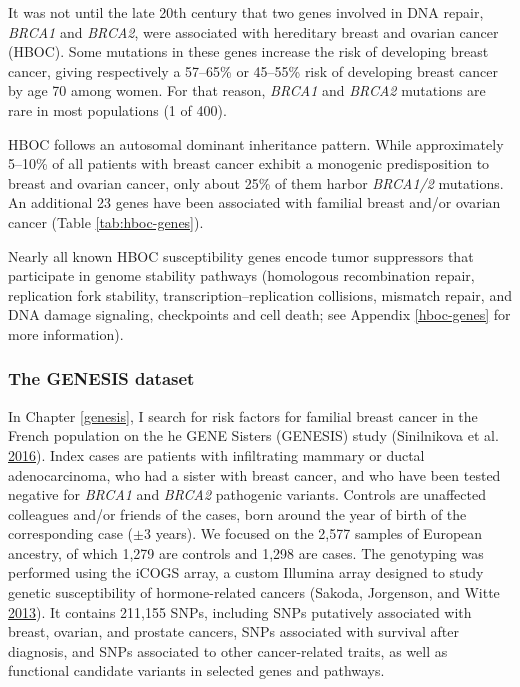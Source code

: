 \documentclass[
  11pt,
]{env/yjiao}
\begin{document}
It was not until the late 20th century that two genes involved in DNA repair, \emph{BRCA1} and \emph{BRCA2}, were associated with hereditary breast and ovarian cancer (HBOC). Some mutations in these genes increase the risk of developing breast cancer, giving respectively a 57--65\% or 45--55\% risk of developing breast cancer by age 70 among women. For that reason, \emph{BRCA1} and \emph{BRCA2} mutations are rare in most populations (1 of 400).

HBOC follows an autosomal dominant inheritance pattern. While approximately 5--10\% of all patients with breast cancer exhibit a monogenic predisposition to breast and ovarian cancer, only about 25\% of them harbor \emph{BRCA1/2} mutations. An additional 23 genes have been associated with familial breast and/or ovarian cancer (Table \ref{tab:hboc-genes}).

Nearly all known HBOC susceptibility genes encode tumor suppressors that participate in genome stability pathways (homologous recombination repair, replication fork stability, transcription--replication collisions, mismatch repair, and DNA damage signaling, checkpoints and cell death; see Appendix \ref{hboc-genes} for more information).

\hypertarget{genesis-dataset}{%
\subsubsection{The GENESIS dataset}\label{genesis-dataset}}

In Chapter \ref{genesis}, I search for risk factors for familial breast cancer
in the French population on the he GENE Sisters (GENESIS) study
(Sinilnikova et al. \protect\hyperlink{ref-sinilnikova_genesis:_2016}{2016}). Index cases are patients with infiltrating
mammary or ductal adenocarcinoma, who had a sister with breast cancer,
and who have been tested negative for \emph{BRCA1} and \emph{BRCA2} pathogenic
variants. Controls are unaffected colleagues and/or friends of the
cases, born around the year of birth of the corresponding case (\(\pm 3\)
years). We focused on the 2,577 samples of European ancestry, of which
1,279 are controls and 1,298 are cases. The genotyping was performed
using the iCOGS array, a custom Illumina array designed to study genetic
susceptibility of hormone-related cancers (Sakoda, Jorgenson, and Witte \protect\hyperlink{ref-sakoda_turning_2013}{2013}). It
contains 211,155 SNPs, including SNPs putatively associated with breast,
ovarian, and prostate cancers, SNPs associated with survival after
diagnosis, and SNPs associated to other cancer-related traits, as well
as functional candidate variants in selected genes and pathways.
\end{document}

